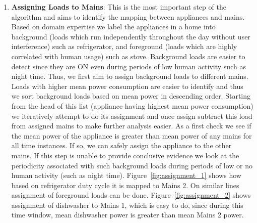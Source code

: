 \documentclass[conference]{IEEEtran}
\newcommand{\figref}[1]{Figure~\ref{#1}}
\begin{document}
\begin{enumerate}
\item \textbf{Assigning Loads to Mains}: This is the most important step of the algorithm and aims to identify the mapping between appliances and mains. Based on domain expertise we label the appliances in a home into background (loads which run independently throughout the day without user interference) such as refrigerator, and foreground (loads which are highly correlated with human usage) such as stove. Background loads are easier to detect since they are ON even during periods of low human activity such as night time. Thus, we first aim to assign background loads to different mains. Loads with higher mean power consumption are easier to identify and thus we sort background loads based on mean power in descending order. Starting from the head of this list (appliance having highest mean power consumption) we iteratively attempt to do its assignment and once assign subtract this load from assigned mains to make further analysis easier. As a first check we see if the mean power of the appliance is greater than mean power of any mains for all time instances. If so, we can safely assign the appliance to the other mains. If this step is unable to provide conclusive evidence we look at the periodicity associated with such background loads during periods of low or no human activity (such as night time). \figref{fig:assignment_1} shows how based on refrigerator duty cycle it is mapped to Mains 2. On similar lines assignment of foreground loads can be done. \figref{fig:assignment_2} shows assignment of dishwasher to Mains 1, which is easy to do, since during this time window, mean dishwasher power is greater than mean Mains 2 power.
\begin{figure} 
	

\end{figure}
\end{enumerate}
\end{document}
